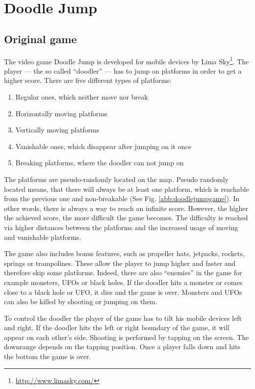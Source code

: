 \documentclass[a4paper,12pt,pagesize,headsepline,bibtotoc,titlepage,abstracton]{scrartcl}
\newcommand{\quot}[1]{{``#1''}}
\begin{document}
\section{Doodle Jump}
\subsection{Original game}
\label{sec:og}

The video game Doodle Jump is developed for mobile devices by Lima Sky\footnote{\url{http://www.limasky.com/}}. The player --- the so called \quot{doodler} --- has to jump on platforms in order to get a higher score. There are five different types of platforms:
\begin{enumerate}
    \item Regular ones, which neither move nor break
    \item Horizontally moving platforms
    \item Vertically moving platforms
    \item Vanishable ones, which disappear after jumping on it once
    \item Breaking platforms, where the doodler can not jump on
\end{enumerate}
The platforms are pseudo-randomly located on the map. Pseudo randomly located means, that there will always be at least one platform, which is reachable from the previous one and non-breakable (See Fig. \ref{abb:doodlejumpgame}). In other words, there is always a way to reach an infinite score. However, the higher the achieved score, the more difficult the game becomes. The difficulty is reached via higher distances between the platforms and the increased usage of moving and vanishable platforms.

The game also includes bonus features, such as propeller hats, jetpacks, rockets, springs or trampolines. These allow the player to jump higher and faster and therefore skip some platforms. Indeed, there are also \quot{enemies} in the game for example monsters, UFOs or black holes. If the doodler hits a monster or comes close to a black hole or UFO, it dies and the game is over. Monsters and UFOs can also be killed by shooting or jumping on them.

To control the doodler the player of the game has to tilt his mobile devices left and right. If the doodler hits the left or right boundary of the game, it will appear on each other's side. Shooting is performed by tapping on the screen. The downrange depends on the tapping position. Once a player falls down and hits the bottom the game is over.
\end{document}
